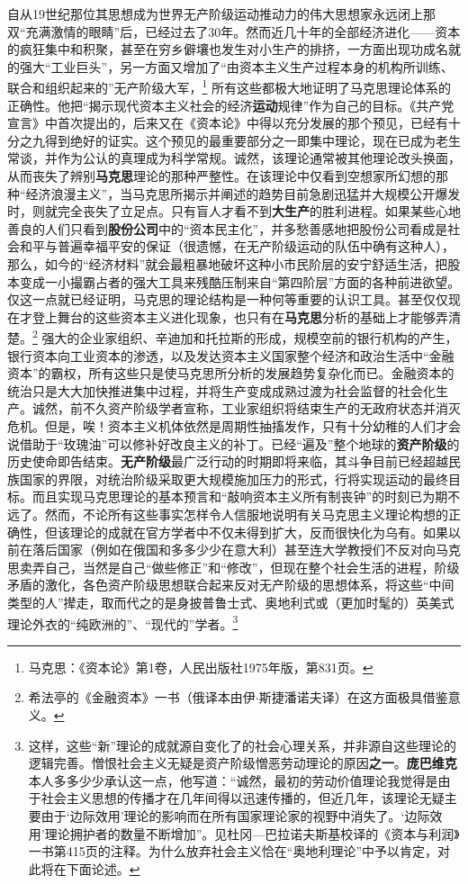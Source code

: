 \documentclass[fontset=fandol, a4paper, 12pt, openright]{ctexbook}
\begin{document}
自从19世纪那位其思想成为世界无产阶级运动推动力的伟大思想家永远闭上那双“充满激情的眼睛”后，已经过去了30年。然而近几十年的全部经济进化——资本的疯狂集中和积聚，甚至在穷乡僻壤也发生对小生产的排挤，一方面出现功成名就的强大“工业巨头”，另一方面又增加了“由资本主义生产过程本身的机构所训练、联合和组织起来的”无产阶级大军，\footnote{马克思：《资本论》第1卷，人民出版社1975年版，第831页。} 所有这些都极大地证明了马克思理论体系的正确性。他把“揭示现代资本主义社会的经济\textbf{运动}规律”作为自己的目标。《共产党宣言》中首次提出的，后来又在《资本论》中得以充分发展的那个预见，已经有十分之九得到绝好的证实。这个预见的最重要部分之一即集中理论，现在已成为老生常谈，并作为公认的真理成为科学常规。诚然，该理论通常被其他理论改头换面，从而丧失了辨别\textbf{马克思}理论的那种严整性。在该理论中仅看到空想家所幻想的那种“经济浪漫主义”，当马克思所揭示并阐述的趋势目前急剧迅猛并大规模公开爆发时，则就完全丧失了立足点。只有盲人才看不到\textbf{大生产}的胜利进程。如果某些心地善良的人们只看到\textbf{股份公司}中的“资本民主化”，并多愁善感地把股份公司看成是社会和平与普遍幸福平安的保证（很遗憾，在无产阶级运动的队伍中确有这种人），那么，如今的“经济材料”就会最粗暴地破坏这种小市民阶层的安宁舒适生活，把股本变成一小撮霸占者的强大工具来残酷压制来自“第四阶层”方面的各种前进欲望。仅这一点就已经证明，马克思的理论结构是一种何等重要的认识工具。甚至仅仅现在才登上舞台的这些资本主义进化现象，也只有在\textbf{马克思}分析的基础上才能够弄清楚。\footnote{希法亭的《金融资本》一书（俄译本由伊$\cdot$斯捷潘诺夫译）在这方面极具借鉴意义。} 强大的企业家组织、辛迪加和托拉斯的形成，规模空前的银行机构的产生，银行资本向工业资本的渗透，以及发达资本主义国家整个经济和政治生活中“金融资本”的霸权，所有这些只是使马克思所分析的发展趋势复杂化而已。金融资本的统治只是大大加快推进集中过程，并将生产变成成熟过渡为社会监督的社会化生产。诚然，前不久资产阶级学者宣称，工业家组织将结束生产的无政府状态并消灭危机。但是，唉！资本主义机体依然是周期性抽搐发作，只有十分幼稚的人们才会说借助于“玫瑰油”可以修补好改良主义的补丁。已经“遍及”整个地球的\textbf{资产阶级}的历史使命即告结束。\textbf{无产阶级}最广泛行动的时期即将来临，其斗争目前已经超越民族国家的界限，对统治阶级采取更大规模施加压力的形式，行将实现运动的最终目标。而且实现马克思理论的基本预言和“敲响资本主义所有制丧钟”的时刻已为期不远了。然而，不论所有这些事实怎样令人信服地说明有关马克思主义理论构想的正确性，但该理论的成就在官方学者中不仅未得到扩大，反而很快化为乌有。如果以前在落后国家（例如在俄国和多多少少在意大利）甚至连大学教授们不反对向马克思卖弄自己，当然是自己“做些修正”和“修改”，但现在整个社会生活的进程，阶级矛盾的激化，各色资产阶级思想联合起来反对无产阶级的思想体系，将这些“中间类型的人”撵走，取而代之的是身披普鲁士式、奥地利式或（更加时髦的）英美式理论外衣的“纯欧洲的”、“现代的”学者。\footnote{这样，这些“新”理论的成就源自变化了的社会心理关系，并非源自这些理论的逻辑完善。憎恨社会主义无疑是资产阶级憎恶劳动理论的原因\textbf{之一}。\textbf{庞巴维克}本人多多少少承认这一点，他写道：“诚然，最初的劳动价值理论我觉得是由于社会主义思想的传播才在几年间得以迅速传播的，但近几年，该理论无疑主要由于‘边际效用’理论的影响而在所有国家理论家的视野中消失了。‘边际效用’理论拥护者的数量不断增加”。见杜冈—巴拉诺夫斯基校译的《资本与利润》一书第415页的注释。为什么放弃社会主义恰在“奥地利理论”中予以肯定，对此将在下面论述。}
\end{document}
